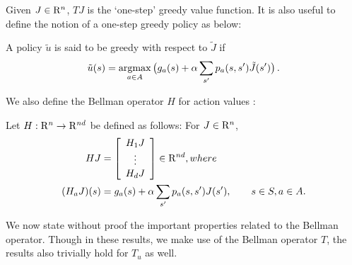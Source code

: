 Given $J \in \mathrm{R}^n$, $TJ$ is the `one-step' greedy value function. It is also useful to define the notion of a one-step greedy policy as below:
\begin{definition}
A policy $\tilde{u}$ is said to be greedy with respect to $\tilde{J}$ if
\begin{align}\label{subpol}
\tilde{u}(s)=\underset{a \in A}{\argmax} \, \big(g_a(s)+\alpha\sum_{s'} p_a(s,s')\tilde{J}(s')\big)\,.
\end{align}
\end{definition}
We also define the Bellman operator $H$ for action values  \cite{BertB}: 
\begin{definition}
Let $H: \mathrm{R}^n \to \mathrm{R}^{nd}$ be defined as follows: For $J\in \mathrm{R}^n$,
\begin{align}
HJ&=\left[ {\begin{array}{c} H_1 J  \\ \vdots \\ H_d J\end{array}} \right]\in \mathrm{R}^{nd},\relax{where}\nonumber\\
(H_a J)(s)&= g_a(s)+\alpha \sum_{s'}p_a(s,s') J(s'), \qquad s\in S, a\in A.
\end{align}
\end{definition}
 We now state without proof the important properties related to the Bellman operator. Though in these results, we make use of the Bellman operator $T$, the results also trivially hold for $T_u$ as well.
